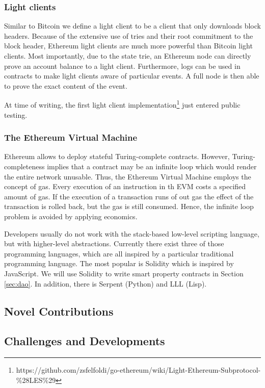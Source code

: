 \subsubsection{Light clients}

Similar to Bitcoin we define a light client to be a client that only downloads block headers. Because of the extensive use of tries and their root commitment to the block header, Ethereum light clients are much more powerful than Bitcoin light clients. 
Most importantly, due to the state trie, an Ethereum node can directly prove an account balance to a light client. Furthermore, logs can be used in contracts to make light clients aware of particular events. A full node is then able to prove the exact content of the event.

At time of writing, the first light client implementation\footnote{https://github.com/zsfelfoldi/go-ethereum/wiki/Light-Ethereum-Subprotocol-\%28LES\%29} just entered public testing.

\subsubsection{The Ethereum Virtual Machine}

Ethereum allows to deploy stateful Turing-complete contracts. However, Turing-completeness implies that a contract may be an infinite loop which would render the entire network unusable. Thus, the Ethereum Virtual Machine employs the concept of gas. Every execution of an instruction in th EVM costs a specified amount of gas. If the execution of a transaction runs of out gas the effect of the transaction is rolled back, but the gas is still consumed. Hence, the infinite loop problem is avoided by applying economics.

Developers usually do not work with the stack-based low-level scripting language, but with higher-level abstractions. Currently there exist three of those programming languages, which are all inspired by a particular traditional programming language. The most popular is Solidity which is inspired by JavaScript. We will use Solidity to write smart property contracts in Section \ref{sec:dao}. In addition, there is Serpent (Python) and LLL (Lisp).

\subsection{Novel Contributions}

\subsection{Challenges and Developments}


